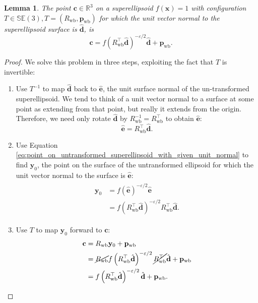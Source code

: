 \documentclass[]{article}
\newcommand{\transpose}{^{\top}}
\newcommand{\colvec}[1]{\mathbf{#1}}
\newtheorem{lemma}{Lemma}
\theoremstyle{definition}
\theoremstyle{remark}
\begin{document}
\begin{lemma}
The point $\colvec{c}\in\mathbb{R}^3$ on a superellipsoid $f(\colvec{x}) = 1$ with configuration $T\in\mathbb{SE}(3),T = \left(R_\mathrm{wb},\colvec{p}_\mathrm{wb}\right)$ for which the unit vector normal to the superellipsoid surface is $\hat{\colvec{d}}$, is
\begin{equation}
	\colvec{c} = f\left(R_\mathrm{wb}\transpose\hat{\colvec{d}}\right)^{-\varepsilon/2}\hat{\colvec{d}} + \colvec{p}_\mathrm{wb}.
\end{equation}
\end{lemma}
\begin{proof}
We solve this problem in three steps, exploiting the fact that $T$ is invertible:
\begin{enumerate}
	\item Use $T^{-1}$ to map $\hat{\colvec{d}}$ back to $\hat{\colvec{e}}$, the unit surface normal of the un-transformed superellipsoid.
	We tend to think of a unit vector normal to a surface at some point as extending from that point, but really it extends from the origin.
	Therefore, we need only rotate $\hat{\colvec{d}}$ by $R_\mathrm{wb}^{-1} = R_\mathrm{wb}\transpose$ to obtain $\hat{\colvec{e}}$:
	\begin{equation*}
		\hat{\colvec{e}} = R_\mathrm{wb}\transpose\hat{\colvec{d}}.
	\end{equation*}

	\item Use Equation \eqref{eq:point_on_untransformed_superellipsoid_with_given_unit_normal} to find $\colvec{y}_0$, the point on the surface of the untransformed ellipsoid for which the unit vector normal to the surface is $\hat{\colvec{e}}$:
	\begin{align*}
		\begin{split}
			\colvec{y}_0 &= f\left(\hat{\colvec{e}}\right)^{-\varepsilon/2}\hat{\colvec{e}}\\
			&= f\left(R_\mathrm{wb}\transpose\hat{\colvec{d}}\right)^{-\varepsilon/2}R_\mathrm{wb}\transpose\hat{\colvec{d}}.
		\end{split}
	\end{align*}

	\item Use $T$ to map $\colvec{y}_0$ forward to $\colvec{c}$:
	\begin{align*}
		\begin{split}
			\colvec{c} &= R_\mathrm{wb}\colvec{y}_0 + \colvec{p}_\mathrm{wb}\\
			&= \cancel{R_\mathrm{wb}}f\left(R_\mathrm{wb}\transpose\hat{\colvec{d}}\right)^{-\varepsilon/2}\cancel{R_\mathrm{wb}\transpose}\hat{\colvec{d}} + \colvec{p}_\mathrm{wb}\\
			&= f\left(R_\mathrm{wb}\transpose\hat{\colvec{d}}\right)^{-\varepsilon/2}\hat{\colvec{d}} + \colvec{p}_\mathrm{wb}.
		\end{split}
	\end{align*}
\end{enumerate}
\end{proof}
\end{document}
